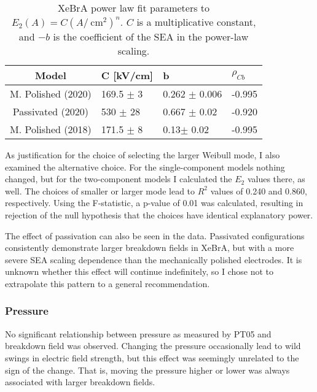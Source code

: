 \begin{table}
    \centering
    \begin{tabular}{|c|l|l|l|}
    \hline
         Model & C [kV/cm] & b & $\rho_{Cb}$\\
          \hline 
         M. Polished (2020)& 169.5 $\pm$ 3 & 0.262 $\pm$ 0.006 & -0.995\\
         Passivated (2020) & 530 $\pm$ 28 & 0.667 $\pm$ 0.02 & -0.920\\
         M. Polished (2018) & 171.5 $\pm$ 8& 0.13$ \pm$ 0.02 & -0.995\\
         \hline
    \end{tabular}
    \caption{XeBrA power law fit parameters to $E_2(A) = C(A/\mathrm{~cm}^2)^n$. 
    $C$ is a multiplicative constant, and $-b$ is the coefficient of the SEA in the power-law scaling. 
    }
    \label{tab:powerlaw_fits}
\end{table}

As justification for the choice of selecting the larger Weibull mode, I also examined the alternative choice.
For the single-component models nothing changed, but for the two-component models I calculated the $E_2$ values there, as well.
The choices of smaller or larger mode lead to $R^2$ values of 0.240 and 0.860, respectively.
Using the F-statistic\cite{noauthor_165_2019}, a p-value of 0.01 was calculated, resulting in rejection of the null hypothesis that the choices have identical explanatory power.

The effect of passivation can also be seen in the data.
Passivated configurations consistently demonstrate larger breakdown fields in XeBrA, but with a more severe SEA scaling dependence than the mechanically polished electrodes.
It is unknown whether this effect will continue indefinitely, so I chose not to extrapolate this pattern to a general recommendation.

\subsubsection{Pressure}
No significant relationship between pressure as measured by PT05 and breakdown field was observed.
Changing the pressure occasionally lead to wild swings in electric field strength, but this effect was seemingly unrelated to the sign of the change.
That is, moving the pressure higher or lower was always associated with larger breakdown fields.

